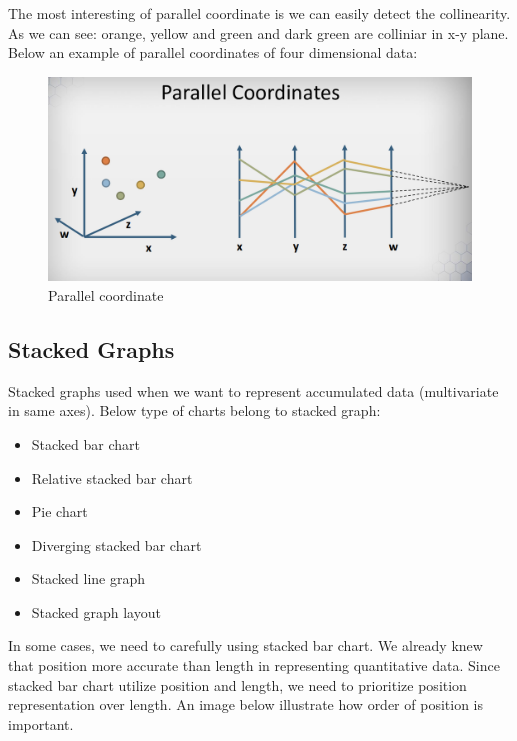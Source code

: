 \documentclass[11pt]{article}
\makeatletter
\def\maxwidth{\ifdim\Gin@nat@width>\linewidth\linewidth
    \else\Gin@nat@width\fi}
\let\Oldincludegraphics\includegraphics
\renewcommand{\includegraphics}[1]{\Oldincludegraphics[width=.8\maxwidth]{#1}}
\providecommand{\tightlist}{%
      \setlength{\itemsep}{0pt}\setlength{\parskip}{0pt}}
\makeatother
\begin{document}
The most interesting of parallel coordinate is we can easily detect the
collinearity. As we can see: orange, yellow and green and dark green are
colliniar in x-y plane. Below an example of parallel coordinates of four
dimensional data:

\begin{figure}
\centering
\includegraphics{images/parallel-coordinate.png}
\caption{Parallel coordinate}
\end{figure}

    \subsection{Stacked Graphs}\label{stacked-graphs}

Stacked graphs used when we want to represent accumulated data
(multivariate in same axes). Below type of charts belong to stacked
graph:

\begin{itemize}
\tightlist
\item
  Stacked bar chart
\item
  Relative stacked bar chart
\item
  Pie chart
\item
  Diverging stacked bar chart
\item
  Stacked line graph
\item
  Stacked graph layout
\end{itemize}

In some cases, we need to carefully using stacked bar chart. We already
knew that position more accurate than length in representing
quantitative data. Since stacked bar chart utilize position and length,
we need to prioritize position representation over length. An image
below illustrate how order of position is important.
\end{document}
